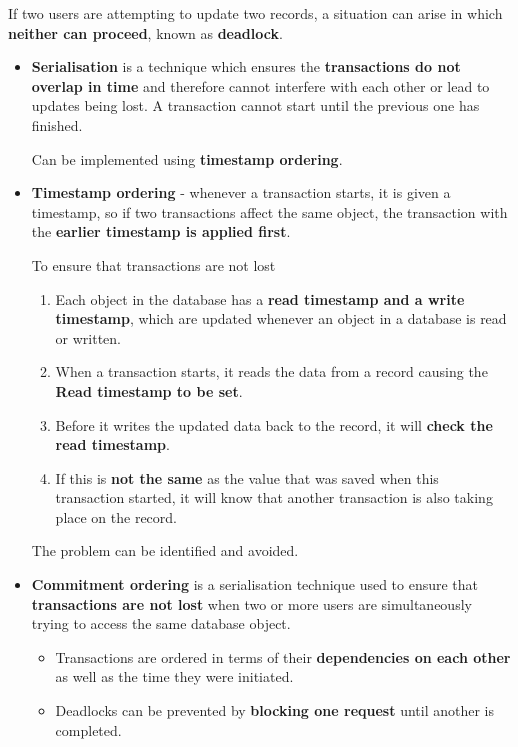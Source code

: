 If two users are attempting to update two records, a situation can arise in which \textbf{neither can proceed}, known as \textbf{deadlock}.
\begin{itemize}
    \item \textbf{Serialisation} is a technique which ensures the \textbf{transactions do not overlap in time} and therefore cannot interfere with each other or lead to updates being lost. A transaction cannot start until the previous one has finished.

        Can be implemented using \textbf{timestamp ordering}.
    \item \textbf{Timestamp ordering} - whenever a transaction starts, it is given a timestamp, so if two transactions affect the same object, the transaction with the \textbf{earlier timestamp is applied first}.

        To ensure that transactions are not lost
        \begin{enumerate}
            \item Each object in the database has a \textbf{read timestamp and a write timestamp}, which are updated whenever an object in a database is read or written.
            \item When a transaction starts, it reads the data from a record causing the \textbf{Read timestamp to be set}.
            \item Before it writes the updated data back to the record, it will \textbf{check the read timestamp}.
            \item If this is \textbf{not the same} as the value that was saved when this transaction started, it will know that another transaction is also taking place on the record.
        \end{enumerate}
        The problem can be identified and avoided.
    \item \textbf{Commitment ordering} is a serialisation technique used to ensure that \textbf{transactions are not lost} when two or more users are simultaneously trying to access the same database object.

        \begin{itemize}
            \item Transactions are ordered in terms of their \textbf{dependencies on each other} as well as the time they were initiated.
            \item Deadlocks can be prevented by \textbf{blocking one request} until another is completed.
        \end{itemize}
\end{itemize}
